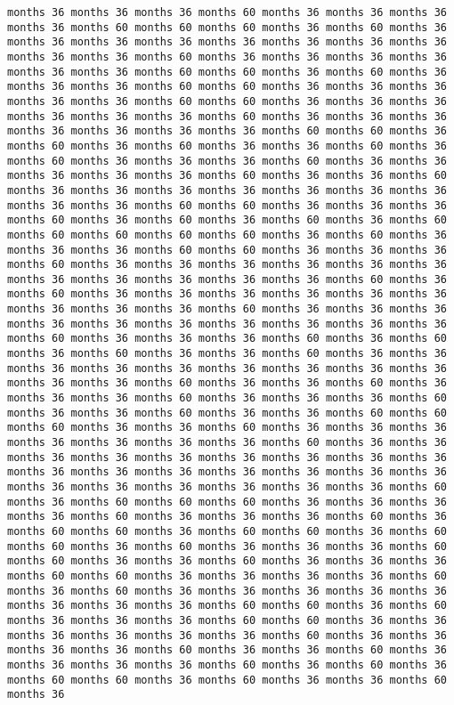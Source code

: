 \documentclass[11pt]{article}
\begin{document}
\begin{Verbatim}[commandchars=\\\{\}, frame=single, framerule=2mm, rulecolor=\color{outerrorbackground}]
months 36 months 36 months 36 months 60 months 36 months 36 months 36 months 36 months 60 months 60 months 60 months 36 months 60 months 36 months 36 months 36 months 36 months 36 months 36 months 36 months 36 months 36 months 36 months 60 months 36 months 36 months 36 months 36 months 36 months 36 months 60 months 60 months 36 months 60 months 36 months 36 months 36 months 60 months 60 months 36 months 36 months 36 months 36 months 36 months 60 months 60 months 36 months 36 months 36 months 36 months 36 months 36 months 60 months 36 months 36 months 36 months 36 months 36 months 36 months 36 months 60 months 60 months 36 months 60 months 36 months 60 months 36 months 36 months 60 months 36 months 60 months 36 months 36 months 36 months 60 months 36 months 36 months 36 months 36 months 36 months 60 months 36 months 36 months 60 months 36 months 36 months 36 months 36 months 36 months 36 months 36 months 36 months 36 months 60 months 60 months 36 months 36 months 36 months 60 months 36 months 60 months 36 months 60 months 36 months 60 months 60 months 60 months 60 months 60 months 36 months 60 months 36 months 36 months 36 months 60 months 60 months 36 months 36 months 36 months 60 months 36 months 36 months 36 months 36 months 36 months 36 months 36 months 36 months 36 months 36 months 36 months 60 months 36 months 60 months 36 months 36 months 36 months 36 months 36 months 36 months 36 months 36 months 36 months 60 months 36 months 36 months 36 months 36 months 36 months 36 months 36 months 36 months 36 months 36 months 60 months 36 months 36 months 36 months 60 months 36 months 60 months 36 months 60 months 36 months 36 months 60 months 36 months 36 months 36 months 36 months 36 months 36 months 36 months 36 months 36 months 36 months 36 months 60 months 36 months 36 months 60 months 36 months 36 months 36 months 60 months 36 months 36 months 36 months 60 months 36 months 36 months 60 months 36 months 36 months 60 months 60 months 60 months 36 months 36 months 60 months 36 months 36 months 36 months 36 months 36 months 36 months 36 months 60 months 36 months 36 months 36 months 36 months 36 months 36 months 36 months 36 months 36 months 36 months 36 months 36 months 36 months 36 months 36 months 36 months 36 months 36 months 36 months 36 months 36 months 36 months 60 months 36 months 60 months 60 months 60 months 36 months 36 months 36 months 36 months 60 months 36 months 36 months 36 months 60 months 36 months 60 months 60 months 36 months 60 months 60 months 36 months 60 months 60 months 36 months 60 months 36 months 36 months 36 months 60 months 60 months 36 months 36 months 60 months 36 months 36 months 36 months 60 months 60 months 36 months 36 months 36 months 36 months 60 months 36 months 60 months 36 months 36 months 36 months 36 months 36 months 36 months 36 months 36 months 60 months 60 months 36 months 60 months 36 months 36 months 36 months 60 months 60 months 36 months 36 months 36 months 36 months 36 months 36 months 60 months 36 months 36 months 36 months 36 months 60 months 36 months 36 months 60 months 36 months 36 months 36 months 36 months 60 months 36 months 60 months 36 months 60 months 60 months 36 months 60 months 36 months 36 months 60 months 36 
\end{Verbatim}
\end{document}
